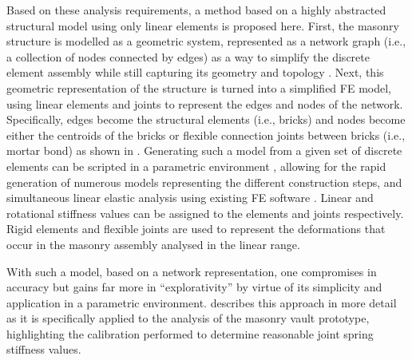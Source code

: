 Based on these analysis requirements, a method based on a highly abstracted structural model using only linear elements is proposed here. First, the masonry structure is modelled as a geometric system, represented as a network graph (i.e., a collection of nodes connected by edges) as a way to simplify the discrete element assembly while still capturing its geometry and topology \cite{kaveh_role_2005, kaveh_efficient_2010}. Next, this geometric representation of the structure is turned into a simplified FE model, using linear elements and joints to represent the edges and nodes of the network. Specifically, edges become the structural elements (i.e., bricks) and nodes become either the centroids of the bricks or flexible connection joints between bricks (i.e., mortar bond) as shown in . Generating such a model from a given set of discrete elements can be scripted in a parametric environment \cite{rutten_grasshopper_2007}, allowing for the rapid generation of numerous models representing the different construction steps, and simultaneous linear elastic analysis using existing FE software \cite{preisinger_karamba_2014}. Linear and rotational stiffness values can be assigned to the elements and joints respectively. Rigid elements and flexible joints are used to represent the deformations that occur in the masonry assembly analysed in the linear range.

With such a model, based on a network representation, one compromises in accuracy but gains far more in ``explorativity'' by virtue of its simplicity and application in a parametric environment.  describes this approach in more detail as it is specifically applied to the analysis of the masonry vault prototype, highlighting the calibration performed to determine reasonable joint spring stiffness values.

